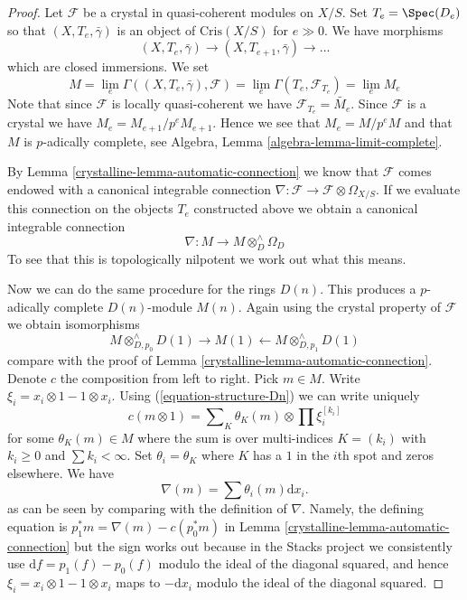 \begin{proof}

Let $\mathcal{F}$ be a crystal in quasi-coherent modules on $X/S$.
Set $T_e = \Spec(D_e)$ so that $(X, T_e, \bar\gamma)$ is an object
of $\text{Cris}(X/S)$ for $e \gg 0$. We have morphisms
$$
(X, T_e, \bar\gamma) \to (X, T_{e + 1}, \bar\gamma) \to \ldots
$$
which are closed immersions. We set
$$
M =
\lim_e \Gamma((X, T_e, \bar\gamma), \mathcal{F}) =
\lim_e \Gamma(T_e, \mathcal{F}_{T_e}) = \lim_e M_e
$$
Note that since $\mathcal{F}$ is locally quasi-coherent we have
$\mathcal{F}_{T_e} = \widetilde{M_e}$. Since $\mathcal{F}$ is a
crystal we have $M_e = M_{e + 1}/p^eM_{e + 1}$. Hence we see that
$M_e = M/p^eM$ and that $M$ is $p$-adically complete, see
Algebra, Lemma \ref{algebra-lemma-limit-complete}.

\medskip\noindent
By Lemma \ref{crystalline-lemma-automatic-connection} we know that $\mathcal{F}$
comes endowed with a canonical integrable connection
$\nabla : \mathcal{F} \to \mathcal{F} \otimes \Omega_{X/S}$.
If we evaluate this connection on the objects $T_e$ constructed above
we obtain a canonical integrable connection
$$
\nabla : M \longrightarrow M \otimes^\wedge_D \Omega_D
$$
To see that this is topologically nilpotent we work out what this means.

\medskip\noindent
Now we can do the same procedure for the rings $D(n)$.
This produces a $p$-adically complete $D(n)$-module $M(n)$. Again using
the crystal property of $\mathcal{F}$ we obtain isomorphisms
$$
M \otimes^\wedge_{D, p_0} D(1) \rightarrow M(1)
\leftarrow M \otimes^\wedge_{D, p_1} D(1)
$$
compare with the proof of Lemma \ref{crystalline-lemma-automatic-connection}.
Denote $c$ the composition from left to right. Pick $m \in M$.
Write $\xi_i = x_i \otimes 1 - 1 \otimes x_i$.
Using (\ref{equation-structure-Dn}) we can write uniquely
$$
c(m \otimes 1) = \sum\nolimits_K \theta_K(m) \otimes \prod \xi_i^{[k_i]}
$$
for some $\theta_K(m) \in M$ where the sum is over multi-indices
$K = (k_i)$ with $k_i \geq 0$ and $\sum k_i < \infty$. Set
$\theta_i = \theta_K$ where $K$ has a $1$ in the $i$th spot and
zeros elsewhere. We have
$$
\nabla(m) = \sum \theta_i(m) \text{d}x_i.
$$
as can be seen by comparing with the definition of
$\nabla$. Namely, the defining equation is
$p_1^*m = \nabla(m) - c(p_0^*m)$ in Lemma \ref{crystalline-lemma-automatic-connection}
but the sign works out because in the Stacks project we consistently use
$\text{d}f = p_1(f) - p_0(f)$ modulo the ideal of the diagonal squared,
and hence $\xi_i = x_i \otimes 1 - 1 \otimes x_i$ maps to $-\text{d}x_i$
modulo the ideal of the diagonal squared.


\end{proof}
